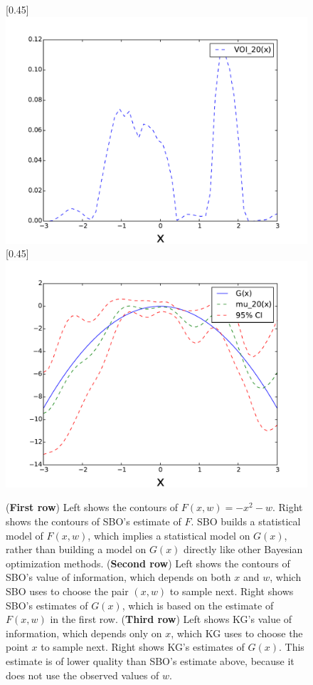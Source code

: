 \documentclass{article}
\newcommand{\w}{w}
\begin{document}
\begin{figure}[!htb]
  [0.45\linewidth]{
      \includegraphics[width=0.44\linewidth]{20VOI_n.pdf}
  }
  \quad
  [0.45\linewidth]{
      \includegraphics[width=0.44\linewidth]{20mu_n.pdf}
  }
\caption{
    ({\bf First row}) Left shows the contours of $F\left(x,\w\right)=-x^{2}-\w$.  Right shows the contours of SBO's estimate of $F$.  SBO builds a statistical model of $F(x,\w)$, which implies a statistical model on $G(x)$, rather than building a model on $G(x)$ directly like other Bayesian optimization methods.
    ({\bf Second row}) Left shows the contours of SBO's value of information, which depends on both $x$ and $\w$, which SBO uses to choose the pair $(x,\w)$ to sample next.  Right shows SBO's estimates of $G(x)$, which is based on the estimate of $F(x,\w)$ in the first row.
    ({\bf Third row}) Left shows KG's value of information, which depends only on $x$, which KG uses to choose the point $x$ to sample next.  Right shows KG's estimates of $G(x)$.  This estimate is of lower quality than SBO's estimate above, because it does not use the observed values of $\w$.
\label{fig:tahi10}}
\end{figure}
\end{document}
